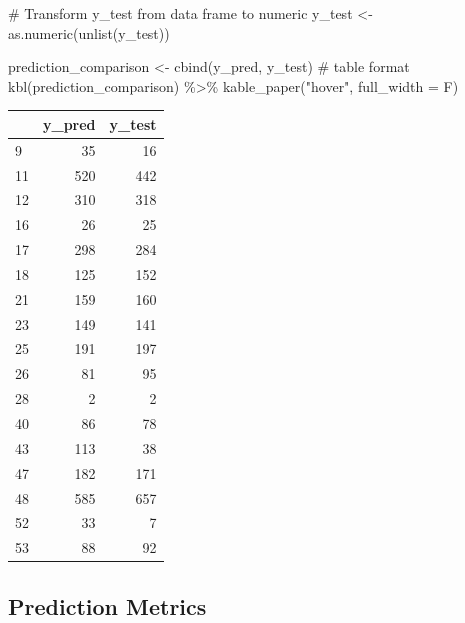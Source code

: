 \documentclass[
  letterpaper,
  DIV=11,
  numbers=noendperiod]{scrreprt}
\newenvironment{Shaded}{\begin{snugshade}}{\end{snugshade}}
\newcommand{\AttributeTok}[1]{\textcolor[rgb]{0.40,0.45,0.13}{#1}}
\newcommand{\CommentTok}[1]{\textcolor[rgb]{0.37,0.37,0.37}{#1}}
\newcommand{\FunctionTok}[1]{\textcolor[rgb]{0.28,0.35,0.67}{#1}}
\newcommand{\NormalTok}[1]{\textcolor[rgb]{0.00,0.23,0.31}{#1}}
\newcommand{\OtherTok}[1]{\textcolor[rgb]{0.00,0.23,0.31}{#1}}
\newcommand{\SpecialCharTok}[1]{\textcolor[rgb]{0.37,0.37,0.37}{#1}}
\newcommand{\StringTok}[1]{\textcolor[rgb]{0.13,0.47,0.30}{#1}}
\begin{document}
\begin{Shaded}
\begin{Highlighting}[]
\CommentTok{\# Transform y\_test from data frame to numeric}
\NormalTok{y\_test }\OtherTok{\textless{}{-}} \FunctionTok{as.numeric}\NormalTok{(}\FunctionTok{unlist}\NormalTok{(y\_test))}

\NormalTok{prediction\_comparison }\OtherTok{\textless{}{-}} \FunctionTok{cbind}\NormalTok{(y\_pred, y\_test)}
\CommentTok{\# table format}
\FunctionTok{kbl}\NormalTok{(prediction\_comparison) }\SpecialCharTok{\%\textgreater{}\%}
  \FunctionTok{kable\_paper}\NormalTok{(}\StringTok{"hover"}\NormalTok{, }\AttributeTok{full\_width =}\NormalTok{ F)}
\end{Highlighting}
\end{Shaded}

\begin{table}
\centering
\begin{tabular}[t]{l|r|r}
\hline
  & y\_pred & y\_test\\
\hline
9 & 35 & 16\\
\hline
11 & 520 & 442\\
\hline
12 & 310 & 318\\
\hline
16 & 26 & 25\\
\hline
17 & 298 & 284\\
\hline
18 & 125 & 152\\
\hline
21 & 159 & 160\\
\hline
23 & 149 & 141\\
\hline
25 & 191 & 197\\
\hline
26 & 81 & 95\\
\hline
28 & 2 & 2\\
\hline
40 & 86 & 78\\
\hline
43 & 113 & 38\\
\hline
47 & 182 & 171\\
\hline
48 & 585 & 657\\
\hline
52 & 33 & 7\\
\hline
53 & 88 & 92\\
\hline
\end{tabular}
\end{table}

\hypertarget{prediction-metrics}{%
\subsection{Prediction Metrics}\label{prediction-metrics}}
\end{document}
